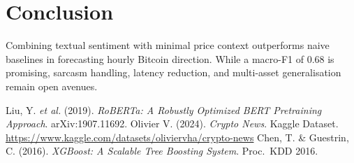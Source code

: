 \documentclass[12pt,a4paper]{article}
\begin{document}
\section{Conclusion}
Combining textual sentiment with minimal price context
outperforms naive baselines in forecasting hourly Bitcoin direction.
While a macro-F1 of 0.68 is promising, sarcasm handling,
latency reduction, and multi-asset generalisation remain open avenues.

\begin{thebibliography}{9}
Liu, Y. \emph{et al.} (2019).
\textit{RoBERTa: A Robustly Optimized BERT Pretraining Approach}.
arXiv:1907.11692.
Olivier V\@halde. (2024).
\textit{Crypto News}.
Kaggle Dataset.  \url{https://www.kaggle.com/datasets/oliviervha/crypto-news}
Chen, T. \& Guestrin, C. (2016).
\textit{XGBoost: A Scalable Tree Boosting System}.
Proc.\ KDD 2016.
\end{thebibliography}
\end{document}
